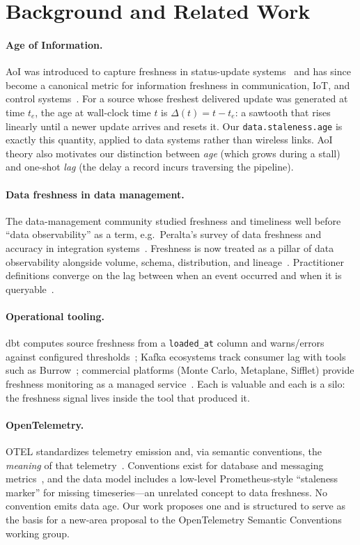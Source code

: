\documentclass[11pt]{article}
\begin{document}
\section{Background and Related Work}
\label{sec:related}

\paragraph{Age of Information.}
AoI was introduced to capture freshness in status-update
systems~\cite{kaul2012} and has since become a canonical metric for
information freshness in communication, IoT, and control
systems~\cite{yates2021survey}. For a source whose freshest delivered update
was generated at time \(t_e\), the age at wall-clock time \(t\) is
\(\Delta(t) = t - t_e\): a sawtooth that rises linearly until a newer update
arrives and resets it. Our \texttt{data.staleness.age} is exactly this
quantity, applied to data systems rather than wireless links. AoI theory also
motivates our distinction between \emph{age} (which grows during a stall) and
one-shot \emph{lag} (the delay a record incurs traversing the pipeline).

\paragraph{Data freshness in data management.}
The data-management community studied freshness and timeliness well before
``data observability'' as a term, e.g.\ Peralta's survey of data freshness and
accuracy in integration systems~\cite{peralta2006}. Freshness is now treated as
a pillar of data observability alongside volume, schema, distribution, and
lineage~\cite{montecarlo}. Practitioner definitions converge on the lag between
when an event occurred and when it is queryable~\cite{metaplane,sifflet}.

\paragraph{Operational tooling.}
dbt computes source freshness from a \texttt{loaded\_at} column and warns/errors
against configured thresholds~\cite{dbtfreshness}; Kafka ecosystems track
consumer lag with tools such as Burrow~\cite{burrow}; commercial platforms
(Monte Carlo, Metaplane, Sifflet) provide freshness monitoring as a managed
service~\cite{montecarlo,metaplane,sifflet}. Each is valuable and each is a
silo: the freshness signal lives inside the tool that produced it.

\paragraph{OpenTelemetry.}
OTEL standardizes telemetry emission and, via semantic conventions, the
\emph{meaning} of that telemetry~\cite{otelsemconv}. Conventions exist for
database and messaging metrics~\cite{otelmessaging}, and the data model includes
a low-level Prometheus-style ``staleness marker'' for missing
timeseries---an unrelated concept to data freshness. No convention emits data
age. Our work proposes one and is structured to serve as the basis for a
new-area proposal to the OpenTelemetry Semantic Conventions working group.
\end{document}
